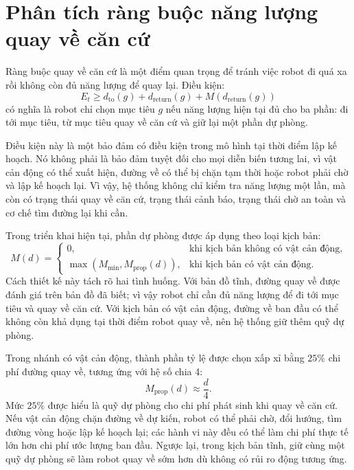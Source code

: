 \documentclass[../DoAn.tex]{subfiles}
\begin{document}
\section{Phân tích ràng buộc năng lượng quay về căn cứ}

Ràng buộc quay về căn cứ là một điểm quan trọng để tránh việc robot đi quá xa rồi không còn đủ năng lượng để quay lại. Điều kiện:
\begin{equation}
E_t \ge d_{\text{to}}(g)+d_{\text{return}}(g)+M(d_{\text{return}}(g))
\end{equation}
có nghĩa là robot chỉ chọn mục tiêu $g$ nếu năng lượng hiện tại đủ cho ba phần: đi tới mục tiêu, từ mục tiêu quay về căn cứ và giữ lại một phần dự phòng.

Điều kiện này là một bảo đảm có điều kiện trong mô hình tại thời điểm lập kế hoạch. Nó không phải là bảo đảm tuyệt đối cho mọi diễn biến tương lai, vì vật cản động có thể xuất hiện, đường về có thể bị chặn tạm thời hoặc robot phải chờ và lập kế hoạch lại. Vì vậy, hệ thống không chỉ kiểm tra năng lượng một lần, mà còn có trạng thái quay về căn cứ, trạng thái cảnh báo, trạng thái chờ an toàn và cơ chế tìm đường lại khi cần.

Trong triển khai hiện tại, phần dự phòng được áp dụng theo loại kịch bản:
\begin{equation}
M(d)=
\begin{cases}
0, & \text{khi kịch bản không có vật cản động},\\
\max(M_{\min}, M_{\text{prop}}(d)), & \text{khi kịch bản có vật cản động}.
\end{cases}
\end{equation}
Cách thiết kế này tách rõ hai tình huống. Với bản đồ tĩnh, đường quay về được đánh giá trên bản đồ đã biết; vì vậy robot chỉ cần đủ năng lượng để đi tới mục tiêu và quay về căn cứ. Với kịch bản có vật cản động, đường về ban đầu có thể không còn khả dụng tại thời điểm robot quay về, nên hệ thống giữ thêm quỹ dự phòng.

Trong nhánh có vật cản động, thành phần tỷ lệ được chọn xấp xỉ bằng $25\%$ chi phí đường quay về, tương ứng với hệ số chia 4:
\begin{equation}
M_{\text{prop}}(d)\approx \frac{d}{4}.
\end{equation}
Mức $25\%$ được hiểu là quỹ dự phòng cho chi phí phát sinh khi quay về căn cứ. Nếu vật cản động chặn đường về dự kiến, robot có thể phải chờ, đổi hướng, tìm đường vòng hoặc lập kế hoạch lại; các hành vi này đều có thể làm chi phí thực tế lớn hơn chi phí ước lượng ban đầu. Ngược lại, trong kịch bản tĩnh, giữ cùng một quỹ dự phòng sẽ làm robot quay về sớm hơn dù không có rủi ro động tương ứng.
\end{document}
